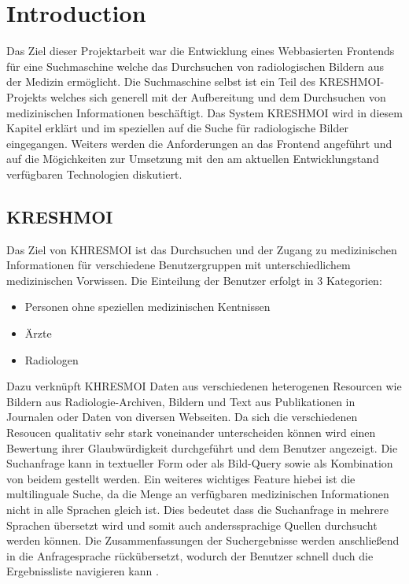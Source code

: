 \section{Introduction}
\label{sec:introduction}
Das Ziel dieser Projektarbeit war die Entwicklung eines Webbasierten Frontends für eine Suchmaschine welche das Durchsuchen von radiologischen Bildern aus der Medizin ermöglicht.
Die Suchmaschine selbst ist ein Teil des KRESHMOI-Projekts welches sich generell mit der Aufbereitung und dem Durchsuchen von medizinischen Informationen beschäftigt.
Das System KRESHMOI wird in diesem Kapitel erklärt und im speziellen auf die Suche für radiologische Bilder eingegangen.
Weiters werden die Anforderungen an das Frontend angeführt und auf die Mögichkeiten zur Umsetzung mit den am aktuellen Entwicklungstand verfügbaren Technologien diskutiert.

\subsection{KRESHMOI}
\label{sec:Motivation}

Das Ziel von KHRESMOI ist das Durchsuchen und der Zugang zu medizinischen Informationen für verschiedene Benutzergruppen mit unterschiedlichem medizinischen Vorwissen.
Die Einteilung der Benutzer erfolgt in 3 Kategorien:
\begin{itemize}
	\item Personen ohne speziellen medizinischen Kentnissen
	\item Ärzte
	\item Radiologen
\end{itemize}
Dazu verknüpft KHRESMOI Daten aus verschiedenen heterogenen Resourcen wie Bildern aus Radiologie-Archiven, Bildern und Text aus Publikationen in Journalen oder Daten von diversen Webseiten.
Da sich die verschiedenen Resoucen qualitativ sehr stark voneinander unterscheiden können wird einen Bewertung ihrer Glaubwürdigkeit durchgeführt und dem Benutzer angezeigt.
Die Suchanfrage kann in textueller Form oder als Bild-Query sowie als Kombination von beidem gestellt werden.
Ein weiteres wichtiges Feature hiebei ist die multilinguale Suche, da die Menge an verfügbaren medizinischen Informationen nicht in alle Sprachen gleich ist.
Dies bedeutet dass die Suchanfrage in mehrere Sprachen übersetzt wird und somit auch anderssprachige Quellen durchsucht werden können.
Die Zusammenfassungen der Suchergebnisse werden anschließend in die Anfragesprache rückübersetzt, 
wodurch der Benutzer schnell duch die Ergebnissliste navigieren kann \cite{kres}.

